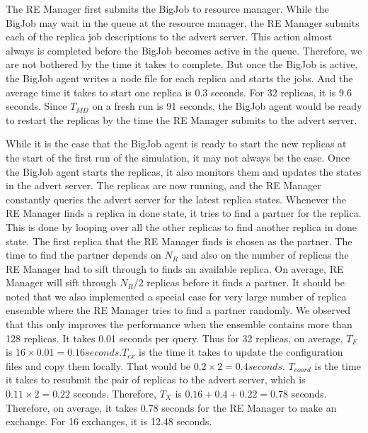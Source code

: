 \documentclass{rspublic}
\begin{document}
The RE Manager first submits the BigJob to resource manager. While the BigJob may wait in the queue at the resource manager, the RE Manager submits each of the replica job descriptions to the advert server. This action almost always is completed before the BigJob becomes active in the queue. Therefore, we are not bothered by the time it takes to complete. But once the BigJob is active, the BigJob agent writes a node file for each replica and starts the jobs. And the average time it takes to start one replica is 0.3 seconds. For 32 replicas, it is 9.6 seconds. Since $T_{MD}$ on a fresh run is 91 seconds, the BigJob agent would be ready to restart the replicas by the time the RE Manager submits to the advert server. 

While it is the case that the BigJob agent is ready to start the new replicas at the start of the first run of the simulation, it may not always be the case. Once the BigJob agent starts the replicas, it also monitors them and updates the states in the advert server. The replicas are now running, and the RE Manager constantly queries the advert server for the latest replica states. Whenever the RE Manager finds a replica in done state, it tries to find a partner for the replica. This is done by looping over all the other replicas to find another replica in done state. The first replica that the RE Manager finds is chosen as the partner. The time to find the partner depends on $N_R$ and also on the number of replicas the RE Manager had to sift through to finds an available replica. On average, RE Manager will sift through $N_R/2$ replicas before it finds a partner. It should be noted that we also implemented a special case for very large number of replica ensemble where the RE Manager tries to find a partner randomly. We observed that this only improves the performance when the ensemble contains more than 128 replicas. It takes 0.01 seconds per query. Thus for 32 replicas, on average, $T_F$ is $16\times 0.01=0.16 seconds. T_{ex}$ is the time it takes to update the configuration files and copy them locally. That would be $0.2\times 2=0.4 seconds.$  $T_{coord}$ is the time it takes to resubmit the pair of replicas to the advert server, which is $0.11\times 2 = 0.22$ seconds. Therefore, $T_X$ is $0.16+0.4+0.22=0.78$ seconds. Therefore, on average, it takes 0.78 seconds for the RE Manager to make an exchange. For 16 exchanges, it is 12.48 seconds.
\end{document}
